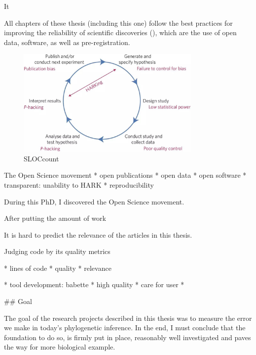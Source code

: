 It 



All chapters of these thesis (including this one) follow the best
practices for improving the reliability of scientific 
discoveries (\cite{munafo2017manifesto}), which are the
use of open data, software, as well as pre-registration.

\begin{figure}[H]
  \includegraphics[width=0.8\textwidth]{munafo2017manifesto_fig_1.jpg}
  \caption{
    SLOCcount 
  }
  \label{fig:manifesto}
\end{figure}







\cite{nosek2015promoting}

The Open Science movement 
 * open publications
 * open data
 * open software
 * transparent: unability to HARK
 * reproducibility


During this PhD, I discovered the Open Science movement. 



After putting the amount of work 

It is hard to predict the relevance of the articles in this thesis.











Judging code by its quality
metrics 

 * lines of code
 * quality
 * relevance



 * tool development: babette
 * high quality
 * care for user
 * 




## Goal 

The goal of the research projects
described in this thesis
was to measure the error we make in today's phylogenetic inference.
In the end, I must conclude that the foundation to do so, is firmly 
put in place, reasonably well investigated and paves the way for
more biological example.

